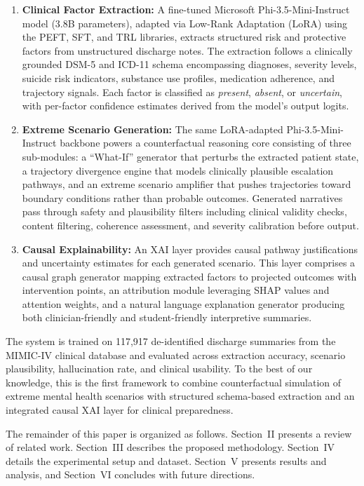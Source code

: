 \documentclass[conference]{IEEEtran}
\begin{document}
\begin{enumerate}
\item \textbf{Clinical Factor Extraction:} A fine-tuned Microsoft Phi-3.5-Mini-Instruct model (3.8B parameters), adapted via Low-Rank Adaptation (LoRA) using the PEFT, SFT, and TRL libraries, extracts structured risk and protective factors from unstructured discharge notes. The extraction follows a clinically grounded DSM-5 and ICD-11 schema encompassing diagnoses, severity levels, suicide risk indicators, substance use profiles, medication adherence, and trajectory signals. Each factor is classified as \textit{present}, \textit{absent}, or \textit{uncertain}, with per-factor confidence estimates derived from the model's output logits.
\item \textbf{Extreme Scenario Generation:} The same LoRA-adapted Phi-3.5-Mini-Instruct backbone powers a counterfactual reasoning core consisting of three sub-modules: a ``What-If'' generator that perturbs the extracted patient state, a trajectory divergence engine that models clinically plausible escalation pathways, and an extreme scenario amplifier that pushes trajectories toward boundary conditions rather than probable outcomes. Generated narratives pass through safety and plausibility filters including clinical validity checks, content filtering, coherence assessment, and severity calibration before output.
\item \textbf{Causal Explainability:} An XAI layer provides causal pathway justifications and uncertainty estimates for each generated scenario. This layer comprises a causal graph generator mapping extracted factors to projected outcomes with intervention points, an attribution module leveraging SHAP values and attention weights, and a natural language explanation generator producing both clinician-friendly and student-friendly interpretive summaries.
\end{enumerate}

The system is trained on 117,917 de-identified discharge summaries from the MIMIC-IV clinical database \cite{b14} and evaluated across extraction accuracy, scenario plausibility, hallucination rate, and clinical usability. To the best of our knowledge, this is the first framework to combine counterfactual simulation of extreme mental health scenarios with structured schema-based extraction and an integrated causal XAI layer for clinical preparedness.

The remainder of this paper is organized as follows. Section~II presents a review of related work. Section~III describes the proposed methodology. Section~IV details the experimental setup and dataset. Section~V presents results and analysis, and Section~VI concludes with future directions.
\end{document}
